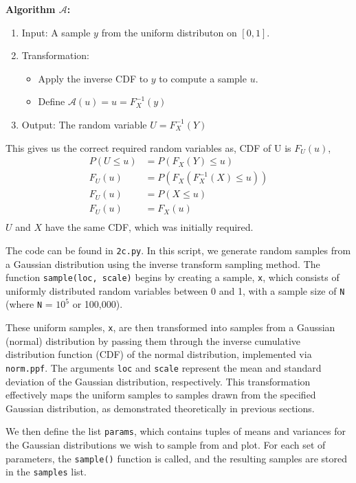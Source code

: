 \begin{solution}
	\textbf{Algorithm $\mathcal{A}$:}
	\begin{enumerate}
		\item Input: A sample $y$ from the uniform distributon on $[0,1]$.
		\item Transformation:
		      \begin{itemize}
			      \item Apply the inverse CDF to $y$ to compute a sample $u$.
			      \item Define $\mathcal{A}(u) = u = F_X^{-1}(y)$
		      \end{itemize}
		\item Output: The random variable $U = F_X^{-1}(Y)$
	\end{enumerate}

	This gives us the correct required random variables as, CDF of U is $F_U(u)$,
	\begin{align}
		P(U\leq u ) & = P(F_X(Y) \leq u)            \\
		F_U(u)      & =  P(F_X(F_X^{-1}(X) \leq u)) \\
		F_U(u)      & =  P(X \leq u)                \\
		F_U(u)      & =  F_X(u)                     \\
	\end{align}
	$U$ and $X$ have the same CDF, which was initially required.

	The code can be found in \texttt{2c.py}. In this script, we generate random samples from a Gaussian distribution using the inverse transform sampling method. The function \texttt{sample(loc, scale)} begins by creating a sample, \texttt{x}, which consists of uniformly distributed random variables between 0 and 1, with a sample size of \texttt{N} (where \texttt{N} = $10^5$ or 100,000).

	These uniform samples, \texttt{x}, are then transformed into samples from a Gaussian (normal) distribution by passing them through the inverse cumulative distribution function (CDF) of the normal distribution, implemented via \texttt{norm.ppf}. The arguments \texttt{loc} and \texttt{scale} represent the mean and standard deviation of the Gaussian distribution, respectively. This transformation effectively maps the uniform samples to samples drawn from the specified Gaussian distribution, as demonstrated theoretically in previous sections.

	We then define the list \texttt{params}, which contains tuples of means and variances for the Gaussian distributions we wish to sample from and plot. For each set of parameters, the \texttt{sample()} function is called, and the resulting samples are stored in the \texttt{samples} list.


\end{solution}
